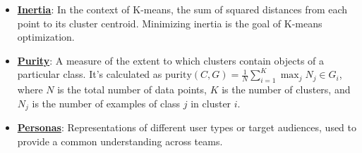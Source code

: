 \documentclass{article}%
\begin{document}
\begin{itemize}[leftmargin=*]
\item \href{https://purdue.brightspace.com/d2l/common/assets/pdfjs-d2l-dist/1.0.14-legacy/web/viewer.html?file=\%2Fcontent\%2Fenforced\%2F1095467-wl.202510.CS.24300.001\%2F12L2-distance-clusters.pdf\%3Fou\%3D1095467\&lang=en-us\&container=d2l-fileviewer-rendered-pdf\&fullscreen=d2l-fileviewer-rendered-pdf-dialog\&height=667#page=33}{\textbf{Inertia}}: In the context of K-means, the sum of squared distances from each point to its cluster centroid. Minimizing inertia is the goal of K-means optimization.%
\item \href{https://purdue.brightspace.com/d2l/common/assets/pdfjs-d2l-dist/1.0.14-legacy/web/viewer.html?file=\%2Fcontent\%2Fenforced\%2F1095467-wl.202510.CS.24300.001\%2F12L2-distance-clusters.pdf\%3Fou\%3D1095467\&lang=en-us\&container=d2l-fileviewer-rendered-pdf\&fullscreen=d2l-fileviewer-rendered-pdf-dialog\&height=667#page=44}{\textbf{Purity}}: A measure of the extent to which clusters contain objects of a particular class. It's calculated as $\text{purity}(C, G) = \frac{1}{N} \sum_{i=1}^K \max_j N_j \in G_i$, where $N$ is the total number of data points, $K$ is the number of clusters, and $N_j$ is the number of examples of class $j$ in cluster $i$.%
\item \href{https://purdue.brightspace.com/d2l/common/assets/pdfjs-d2l-dist/1.0.14-legacy/web/viewer.html?file=\%2Fcontent\%2Fenforced\%2F1095467-wl.202510.CS.24300.001\%2F12L2-distance-clusters.pdf\%3Fou\%3D1095467\&lang=en-us\&container=d2l-fileviewer-rendered-pdf\&fullscreen=d2l-fileviewer-rendered-pdf-dialog\&height=667#page=11}{\textbf{Personas}}: Representations of different user types or target audiences, used to provide a common understanding across teams.%
\end{itemize}

%
\end{document}
